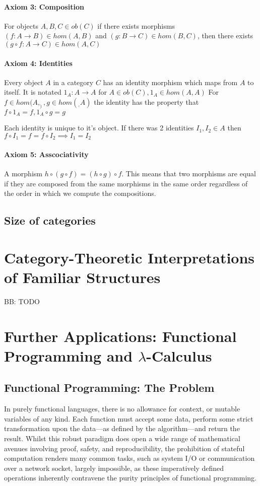 \documentclass[10pt,a4paper]{amsart}
\begin{document}
\paragraph{Axiom 3: Composition}
For objects $A,B,C\in ob(C)$ if there exists morphisms $(f: A\to B)\in hom(A,B)$ and $(g: B\to C)\in hom(B,C)$, then there exists $(g\circ f: A\to C)\in hom(A,C)$
\paragraph{Axiom 4: Identities}
Every object $A$ in a category $C$ has an identity morphism which maps from $A$ to itself.
It is notated $1_A: A\to A$ for $A\in ob(C), 1_A\in hom(A,A)$
For $f\in hom(A,_), g\in hom(_,A)$ the identity has the property that $f\circ 1_A = f, 1_A\circ g = g$

Each identity is unique to it's object. If there was 2 identities $I_1,I_2\in A$ then $f\circ I_1 = f = f\circ I_2 \implies I_1=I_2$
\paragraph{Axiom 5: Asscociativity}
A morphism $h\circ(g\circ f) = (h\circ g)\circ f$. 
This means that two morphisms are equal if they are composed from the same morphisms in the same order
regardless of the order in which we compute the compositions.
\subsection{Size of categories}

\section{Category-Theoretic %
        Interpretations of Familiar Structures}
BB: TODO

\section{Further Applications: %
        Functional Programming and \texorpdfstring{$\lambda$}{Lambda}-Calculus}
\subsection{Functional Programming: The Problem} In purely functional languages,
there is no allowance for context, or mutable variables of any kind. Each
function must accept some data, perform some strict transformation upon the
data---as defined by the algorithm---and return the result. Whilst this robust
paradigm does open a wide range of mathematical avenues involving proof, safety,
and reproducibility, the prohibition of stateful computation renders many common
tasks, such as system I/O or communication over a network socket, largely
impossible, as these imperatively defined operations inherently contravene the
purity principles of functional programming.
\end{document}
